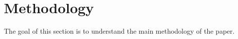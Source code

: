 \documentclass[10pt]{article}
\begin{document}



\section{Methodology}
The goal of this section is to understand the main methodology of the paper.

\end{document}
